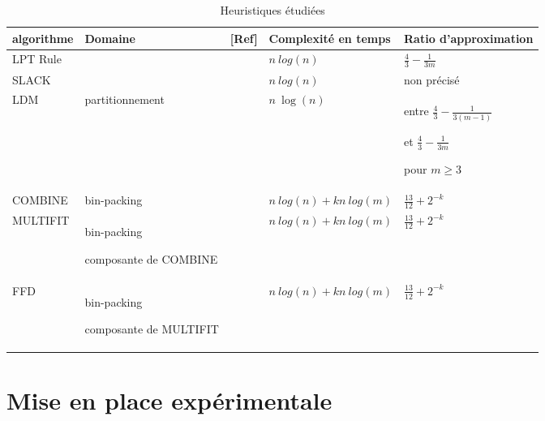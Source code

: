 \documentclass[a4paper,12pt]{report}
\theoremstyle{plain}				%
\theoremstyle{definition}				%
\begin{document}
\begin{table}[h] %
\centering
\begin{tabular}{p{3cm} p{3cm} p{1cm} p{4cm} p{4cm}}
\hline
algorithme 	& Domaine 
			& [Ref] 
			& Complexité en temps 
			& Ratio d'approximation\\
\hline

LPT Rule 	&  
			& \cite{graham1966bounds} 
			& $n~log(n)$ 
			& $\frac{4}{3}-\frac{1}{3m}$ \\

SLACK   	& 
			& \cite{della2020longest} 
			&$n~log(n)$ 
			& non précisé \\

LDM   		&  partitionnement 
			& \cite{karmarkar1982differencing} 
			& $n~\log(n)$ 
			& entre $ \frac{4}{3}-\frac{1}{3(m-1)}$
			
			  et    $\frac{4}{3}-\frac{1}{3 m}$
			  
			  pour $m\geq3$  \\

COMBINE 	& bin-packing 
			& \cite{lee1988multiprocessor} 
			& $ n~log(n) + kn~log(m)$ 
			& $\frac{13}{12} + 2^{-k}$ \\
\hline
MULTIFIT 	&	bin-packing
 
				composante de COMBINE
			& \cite{lee1988multiprocessor} 
			& $ n~log(n) + kn~log(m)$ 
			& $\frac{13}{12} + 2^{-k}$ \\
FFD 		& 	bin-packing
		
				composante de MULTIFIT 
			& \cite{lee1988multiprocessor} 
			& $ n~log(n) + kn~log(m)$ 
			& $\frac{13}{12} + 2^{-k}$ \\




\hline
\end{tabular}
\caption{Heuristiques étudiées}
\label{table:Heuritiques}
\end{table}

\section{Mise en place expérimentale}\label{sec:miseEnPlaceExpérimentale}
\end{document}
